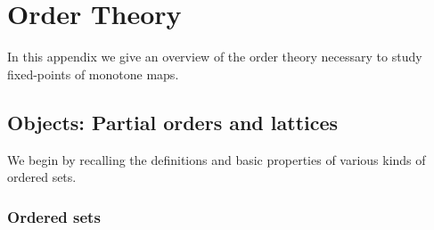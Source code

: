 \chapter[Order theory][Order theory]{Order Theory}\label{app:order-theory}

In this appendix we give an overview of the order theory necessary to study fixed-points of monotone maps.


\section{Objects: Partial orders and lattices}

We begin by recalling the definitions and basic properties of various kinds of ordered sets.

\subsection{Ordered sets}

\makeatletter
\def\dualord{\@ifstar\@dualord\@@dualord}
\def\@dualord#1{(#1)^{\mathit{op}}}
\def\@@dualord#1{#1^{\mathit{op}}}
\makeatother



\makeatletter
\def\upset{\@ifstar\@upset\@@upset}
\def\@upset#1{(#1)^\uparrow}
\def\@@upset#1{#1^\uparrow}
\makeatother



\newcommand{\downset}[1]{#1^\downarrow}

